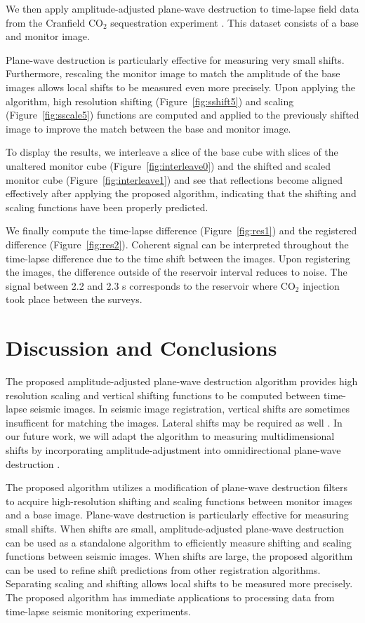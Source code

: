We then apply amplitude-adjusted plane-wave destruction 
to time-lapse field data from the Cranfield CO$_2$ sequestration experiment \cite[]{zhang13,zhang14}. This dataset consists of a base and monitor image.
 
Plane-wave destruction is particularly effective for measuring very small shifts. Furthermore, rescaling the monitor image to match the amplitude of the 
base images allows local shifts to be measured even more precisely. Upon applying 
the algorithm, high resolution shifting (Figure~\ref{fig:sshift5}) and scaling (Figure~\ref{fig:sscale5}) functions are computed and 
applied to the previously shifted image to improve the match between the 
base and monitor image.

To display the results, we interleave a slice of
the base cube with slices of the unaltered monitor cube (Figure~\ref{fig:interleave0}) and the shifted and scaled monitor cube (Figure~\ref{fig:interleave1}) and see that reflections become 
aligned effectively after applying the proposed algorithm, indicating that the shifting and scaling functions have
been properly predicted. 

We finally compute the time-lapse difference (Figure~\ref{fig:res1}) and the registered difference (Figure~\ref{fig:res2}). Coherent signal can be interpreted throughout the time-lapse difference due to 
the time shift between the images. Upon registering the images, the difference outside of the reservoir interval reduces to noise. The signal between 2.2 and 2.3 s corresponds to the reservoir where 
CO$_2$ injection took place between the surveys.

\section{Discussion and Conclusions}
The proposed amplitude-adjusted plane-wave destruction algorithm provides high 
resolution scaling and vertical shifting functions to be computed between 
time-lapse seismic images. In seismic image registration, vertical shifts are 
sometimes insufficent for matching the images. Lateral shifts may be required 
as well \cite[]{hale09}. In our future work, we will adapt the algorithm to 
measuring multidimensional shifts by incorporating amplitude-adjustment into 
omnidirectional plane-wave destruction \cite[]{cheno}.

The proposed algorithm utilizes a modification of plane-wave destruction 
filters to acquire high-resolution shifting and scaling functions between 
monitor images and a base image. Plane-wave destruction is particularly 
effective for measuring small shifts. When shifts are small, amplitude-adjusted 
plane-wave destruction can be used as a standalone algorithm to efficiently 
measure shifting and scaling functions between seismic images. When shifts are 
large, the proposed algorithm can be used to refine shift predictions from 
other registration algorithms. Separating scaling and shifting allows local 
shifts to be measured more precisely. The proposed algorithm has immediate 
applications to processing data from time-lapse seismic monitoring experiments.

